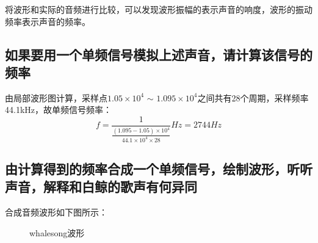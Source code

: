 \documentclass{article}
\begin{document}
            将波形和实际的音频进行比较，可以发现波形振幅的表示声音的响度，波形的振动频率表示声音的频率。

        \subsection{如果要用一个单频信号模拟上述声音，请计算该信号的频率}
            由局部波形图计算，采样点$1.05\times10^4$ $\sim$ $1.095\times10^4$之间共有28个周期，采样频率44.1kHz，故单频信号频率：
            $$f=\frac{1}{\frac{(1.095-1.05)\times10^4}{44.1\times10^4\times28}}Hz=2744Hz$$
            
        \subsection{由计算得到的频率合成一个单频信号，绘制波形，听听声音，解释和白鲸的歌声有何异同}
            合成音频波形如下图所示：
            \begin{figure}[htb]
                \centering
                \hspace{10pt}
                \caption{whalesong波形}
                \label{fig:output1}
            \end{figure}
            
\end{document}
